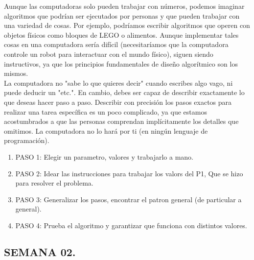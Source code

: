 \documentclass[12pt]{article}
\begin{document}
Aunque las computadoras solo pueden trabajar con números, podemos imaginar algoritmos que podrían ser ejecutados por personas y que pueden trabajar con una variedad de cosas. Por ejemplo, podríamos escribir algoritmos que operen con objetos físicos como bloques de LEGO o alimentos. Aunque implementar tales cosas en una computadora sería difícil (necesitaríamos que la computadora controle un robot para interactuar con el mundo físico), siguen siendo instructivos, ya que los principios fundamentales de diseño algorítmico son los mismos.\\

La computadora no "sabe lo que quieres decir" cuando escribes algo vago, ni puede deducir un "etc.". En cambio, debes ser capaz de describir exactamente lo que deseas hacer paso a paso. Describir con precisión los pasos exactos para realizar una tarea específica es un poco complicado, ya que estamos acostumbrados a que las personas comprendan implícitamente los detalles que omitimos. La computadora no lo hará por ti (en ningún lenguaje de programación).\\

\begin{enumerate}
    \item PASO 1: Elegir un parametro, valores y trabajarlo a mano.
    \item PASO 2: Idear las instrucciones para trabajar los valors del P1, Que se hizo para resolver el problema.
    \item PASO 3: Generalizar los pasos, encontrar el patron general (de particular a general).
    \item PASO 4: Prueba el algoritmo y garantizar que funciona con distintos valores. 
\end{enumerate}

{\color{red} \subsection*{\textbf{SEMANA 02.}}}
\end{document}
